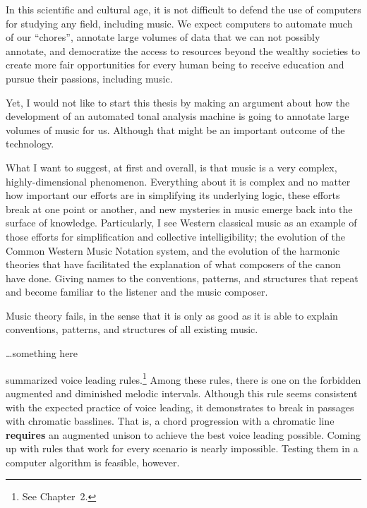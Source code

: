 
In this scientific and cultural age, it is not difficult to
defend the use of computers for studying any field,
including music. We expect computers to automate much of our
``chores'', annotate large volumes of data that we can not
possibly annotate, and democratize the access to resources
beyond the wealthy societies to create more fair
opportunities for every human being to receive education and
pursue their passions, including music.

Yet, I would not like to start this thesis by making an
argument about how the development of an automated tonal
analysis machine is going to annotate large volumes of music
for us. Although that might be an important outcome of the
technology.

What I want to suggest, at first and overall, is that music
is a very complex, highly-dimensional phenomenon. Everything
about it is complex and no matter how important our efforts
are in simplifying its underlying logic, these efforts break
at one point or another, and new mysteries in music emerge
back into the surface of knowledge. Particularly, I see
Western classical music as an example of those efforts for
simplification and collective intelligibility; the evolution
of the Common Western Music Notation system, and the
evolution of the harmonic theories that have facilitated the
explanation of what composers of the canon have done. Giving
names to the conventions, patterns, and structures that
repeat and become familiar to the listener and the music
composer.

Music theory fails, in the sense that it is only as good as
it is able to explain conventions, patterns, and structures
of all existing music.

\dots something here


\textcite{huron2016voice} summarized voice leading
rules.\footnote{See Chapter~2.} Among these rules, there is
one on the forbidden augmented and diminished melodic
intervals. Although this rule seems consistent with the
expected practice of voice leading, it demonstrates to break
in passages with chromatic basslines. That is, a chord
progression with a chromatic line \textbf{requires} an
augmented unison to achieve the best voice leading possible.
Coming up with rules that work for every scenario is nearly
impossible. Testing them in a computer algorithm is
feasible, however.

